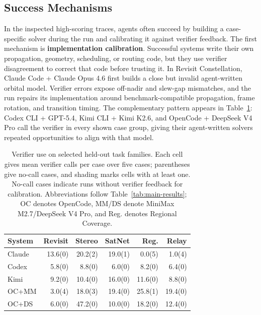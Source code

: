 \documentclass[]{mosi}
\begin{document}
\subsection{Success Mechanisms}
\label{sec:what-succeeds}

In the inspected high-scoring traces, agents often succeed by building a case-specific solver during the run and calibrating it against verifier feedback. The first mechanism is \textbf{implementation calibration}. Successful systems write their own propagation, geometry, scheduling, or routing code, but they use verifier disagreement to correct that code before trusting it. In Revisit Constellation, Claude Code + Claude Opus 4.6 first builds a close but invalid agent-written orbital model. Verifier errors expose off-nadir and slew-gap mismatches, and the run repairs its implementation around benchmark-compatible propagation, frame rotation, and transition timing. The complementary pattern appears in Table~\ref{tab:verifier-calls}: Codex CLI + GPT-5.4, Kimi CLI + Kimi K2.6, and OpenCode + DeepSeek V4 Pro call the verifier in every shown case group, giving their agent-written solvers repeated opportunities to align with that model.

\begin{table}[t]
\centering
\footnotesize
\setlength{\tabcolsep}{3.2pt}
\begin{tabular}{lrrrrr}
\hline
System & Revisit & Stereo & SatNet & Reg. & Relay \\
\hline
Claude & 13.6(0) & \cellcolor{zerocallcell}20.2(2) & \cellcolor{zerocallcell}19.0(1) & \cellcolor{zerocallcell}0.0(5) & \cellcolor{zerocallcell}1.0(4) \\
Codex & 5.8(0) & 8.8(0) & 6.0(0) & 8.2(0) & 6.4(0) \\
Kimi & 9.2(0) & 10.4(0) & 16.0(0) & 11.6(0) & 8.8(0) \\
OC+MM & \cellcolor{zerocallcell}3.0(4) & \cellcolor{zerocallcell}18.0(3) & 19.4(0) & \cellcolor{zerocallcell}25.8(1) & 19.4(0) \\
OC+DS & 6.0(0) & 47.2(0) & 10.0(0) & 18.2(0) & 12.4(0) \\
\hline
\end{tabular}
\caption{Verifier use on selected held-out task families. Each cell gives mean verifier calls per case over five cases; parentheses give no-call cases, and shading marks cells with at least one. No-call cases indicate runs without verifier feedback for calibration. Abbreviations follow Table~\ref{tab:main-results}; OC denotes OpenCode, MM/DS denote MiniMax M2.7/DeepSeek V4 Pro, and Reg. denotes Regional Coverage.}
\label{tab:verifier-calls}
\end{table}
\end{document}
